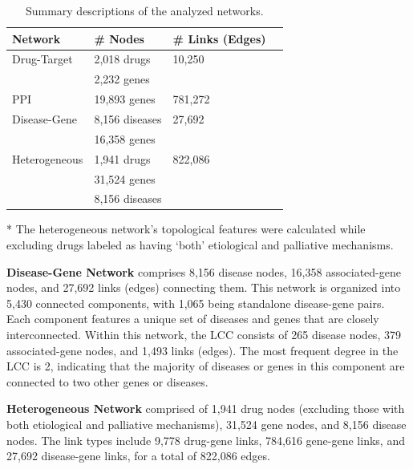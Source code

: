 \documentclass[journal,twoside,web]{ieeecolor}
\begin{document}
\begin{table}
\caption{Summary descriptions of the analyzed networks.
\label{tbl:networkFeatures}}%
\begin{threeparttable}
\begin{tabular*}{\columnwidth}{@{\extracolsep\fill}llll@{\extracolsep\fill}}
\toprule
Network & \# Nodes  & \# Links (Edges)\\
\midrule
Drug-Target               & 2,018 drugs    & 10,250\\
                          & 2,232 genes            \\
\midrule
PPI                       & 19,893 genes   & 781,272\\
\midrule
Disease-Gene              & 8,156 diseases & 27,692\\
                          & 16,358 genes           \\  
\midrule
Heterogeneous\tnote{*}    & 1,941 drugs   & 822,086\\
                          & 31,524 genes           \\
                          & 8,156 diseases         \\
\bottomrule
\end{tabular*}
\begin{tablenotes}
\item[*] The heterogeneous network's topological features were calculated while excluding drugs labeled as having `both' etiological and palliative mechanisms.
\end{tablenotes}
\end{threeparttable}
\end{table}




\textbf{Disease-Gene Network}
comprises 8,156 disease nodes, 16,358 associated-gene nodes, and 27,692 links (edges) connecting them.
This network is organized into 5,430 connected components, with 1,065 being standalone disease-gene pairs.
Each component features a unique set of diseases and genes that are closely interconnected.
Within this network, the LCC consists of 265 disease nodes, 379 associated-gene nodes, and 1,493 links (edges).
The most frequent degree in the LCC is 2, indicating that the majority of diseases or genes in this component are connected to two other genes or diseases.


\textbf{Heterogeneous Network}
comprised of 1,941 drug nodes (excluding those with both etiological and palliative mechanisms), 31,524 gene nodes, and 8,156 disease nodes.
The link types include 9,778 drug-gene links, 784,616 gene-gene links, and 27,692 disease-gene links, for a total of 822,086 edges.
\end{document}
